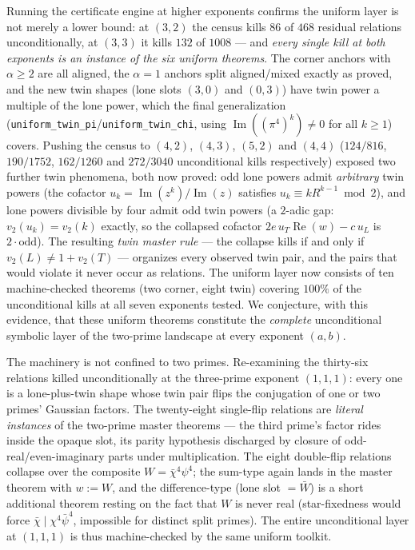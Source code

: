 \documentclass[11pt]{article}
\theoremstyle{remark}
\DeclareMathOperator{\im}{Im}
\DeclareMathOperator{\re}{Re}
\begin{document}
Running the certificate engine at higher exponents confirms the
uniform layer is not merely a lower bound: at $(3,2)$ the census kills
$86$ of $468$ residual relations unconditionally, at $(3,3)$ it kills
$132$ of $1008$ — and \emph{every single kill at both exponents is an
instance of the six uniform theorems}.  The corner anchors with
$\alpha \ge 2$ are all aligned, the $\alpha = 1$ anchors split
aligned/mixed exactly as proved, and the new twin shapes (lone slots
$(3,0)$ and $(0,3)$) have twin power a multiple of the lone power,
which the final generalization
(\texttt{uniform\_twin\_pi}/\texttt{uniform\_twin\_chi}, using
$\im((\pi^4)^k) \ne 0$ for all $k \ge 1$) covers.  Pushing the census to $(4,2)$, $(4,3)$, $(5,2)$ and $(4,4)$
($124/816$, $190/1752$, $162/1260$ and $272/3040$ unconditional kills
respectively) exposed two further twin phenomena, both now proved: odd
lone powers admit \emph{arbitrary} twin powers (the cofactor
$u_k = \im(z^k)/\im(z)$ satisfies $u_k \equiv k R^{k-1} \bmod 2$), and
lone powers divisible by four admit odd twin powers (a $2$-adic gap:
$v_2(u_k) = v_2(k)$ exactly, so the collapsed cofactor
$2e\,u_T\re(w) - c\,u_L$ is $2 \cdot \text{odd}$).  The resulting
\emph{twin master rule} — the collapse kills if and only if
$v_2(L) \ne 1 + v_2(T)$ — organizes every observed twin pair, and the
pairs that would violate it never occur as relations.  The uniform
layer now consists of ten machine-checked theorems (two corner, eight
twin) covering $100\%$ of the unconditional kills at all seven
exponents tested.  We conjecture, with this evidence, that these
uniform theorems constitute the \emph{complete} unconditional symbolic
layer of the two-prime landscape at every exponent $(a,b)$.

The machinery is not confined to two primes.  Re-examining the
thirty-six relations killed unconditionally at the three-prime exponent
$(1,1,1)$: every one is a lone-plus-twin shape whose twin pair flips
the conjugation of one or two primes' Gaussian factors.  The
twenty-eight single-flip relations are \emph{literal instances} of the
two-prime master theorems — the third prime's factor rides inside the
opaque slot, its parity hypothesis discharged by closure of
odd-real/even-imaginary parts under multiplication.  The eight
double-flip relations collapse over the composite
$W = \bar\chi^4\psi^4$; the sum-type again lands in the master theorem
with $w := W$, and the difference-type (lone slot $= \bar W$) is a
short additional theorem resting on the fact that $W$ is never real
(star-fixedness would force $\bar\chi \mid \chi^4\bar\psi^4$,
impossible for distinct split primes).  The entire unconditional layer
at $(1,1,1)$ is thus machine-checked by the same uniform toolkit.
\end{document}

